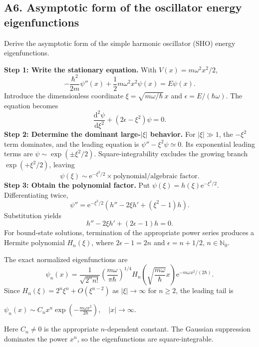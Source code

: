 \documentclass[11pt,a4paper]{article}
\newcommand{\key}[1]{\begin{resultbox}\centering\(\displaystyle #1\)\end{resultbox}}
\newcommand{\dd}{\mathrm{d}}\newcommand{\iu}{\mathrm{i}}\newcommand{\ee}{\mathrm{e}}
\begin{document}
\subsection{A6. Asymptotic form of the oscillator energy eigenfunctions}
\begin{questionbox}
Derive the asymptotic form of the simple harmonic oscillator (SHO) energy eigenfunctions.
\end{questionbox}
\textbf{Step 1: Write the stationary equation.} With \(V(x)=m\omega^2x^2/2\),
\begin{equation}-\frac{\hbar^2}{2m}\psi''(x)+\frac12m\omega^2x^2\psi(x)=E\psi(x).\end{equation}
Introduce the dimensionless coordinate \(\xi=\sqrt{m\omega/\hbar}\,x\) and \(\epsilon=E/(\hbar\omega)\). The equation becomes
\begin{equation}\frac{\dd^2\psi}{\dd\xi^2}+(2\epsilon-\xi^2)\psi=0.\end{equation}
\textbf{Step 2: Determine the dominant large-\(|\xi|\) behavior.} For \(|\xi|\gg1\), the \(-\xi^2\) term dominates, and the leading equation is \(\psi''-\xi^2\psi\simeq0\). Its exponential leading terms are \(\psi\sim\exp(\pm\xi^2/2)\). Square-integrability excludes the growing branch \(\exp(+\xi^2/2)\), leaving
\begin{equation}\psi(\xi)\sim \ee^{-\xi^2/2}\times\text{polynomial/algebraic factor}.\end{equation}
\textbf{Step 3: Obtain the polynomial factor.} Put \(\psi(\xi)=h(\xi)\ee^{-\xi^2/2}\). Differentiating twice,
\begin{equation}\psi''=\ee^{-\xi^2/2}\left(h''-2\xi h'+(\xi^2-1)h\right).\end{equation}
Substitution yields
\begin{equation}h''-2\xi h'+(2\epsilon-1)h=0.\end{equation}
For bound-state solutions, termination of the appropriate power series produces a Hermite polynomial \(H_n(\xi)\), where \(2\epsilon-1=2n\) and \(\epsilon=n+1/2\), \(n\in\mathbb N_0\).

The exact normalized eigenfunctions are
\begin{equation}
\psi_n(x)=\frac{1}{\sqrt{2^nn!}}\left(\frac{m\omega}{\pi\hbar}\right)^{1/4}
H_n\!\left(\sqrt{\frac{m\omega}{\hbar}}x\right)\ee^{-m\omega x^2/(2\hbar)}.
\end{equation}
Since \(H_n(\xi)=2^n\xi^n+O(\xi^{n-2})\) as \(|\xi|\to\infty\) for \(n\ge2\), the leading tail is
\key{\boxed{\psi_n(x)\sim C_nx^n\exp\!\left(-\frac{m\omega x^2}{2\hbar}\right),\quad |x|\to\infty.}}
Here \(C_n\neq0\) is the appropriate \(n\)-dependent constant. The Gaussian suppression dominates the power \(x^n\), so the eigenfunctions are square-integrable.
\end{document}
